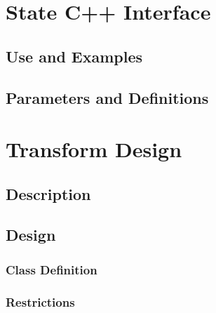 \documentclass[]{article}
\begin{document}




\section{State C++ Interface}

\subsection{Use and Examples}




\subsection{Parameters and Definitions}










\section{Transform Design}

\subsection{Description}




\subsection{Design}




\subsubsection{Class Definition}




\subsubsection{Restrictions}
\end{document}
